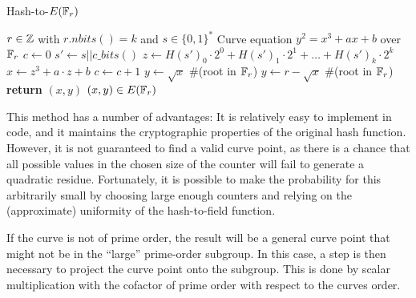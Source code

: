 \begin{algorithm}\caption{Hash-to-$E(\mathbb{F}_r)$}
\begin{algorithmic}[0]
\Require $r \in \mathbb{Z}$ with $r.nbits()=k$ and $s\in\{0,1\}^*$
\Require Curve equation $y^2 = x^3 + ax +b$ over $\mathbb{F}_r$
\State $c \gets 0$
\Repeat
\State $s' \gets s||c\_bits()$
\State $z \gets H(s')_0\cdot 2^0 + H(s')_1\cdot 2^1 + \ldots + H(s')_{k}\cdot 2^{k}$
\State $x\gets z^3 + a\cdot z + b$
\State $c\gets c+1$
\State $y \gets \sqrt{x}$ \#(root in $\mathbb{F}_r$)
\Else 
\State $y \gets r-\sqrt{x}$ \#(root in $\mathbb{F}_r$)
\EndIf
\State \textbf{return} $(x,y)$
\EndProcedure
\Ensure $(x,y)\in E(\mathbb{F}_r)$
\end{algorithmic}
\end{algorithm}

This method has a number of advantages: It is relatively easy to implement in code, and it maintains the cryptographic properties of the original hash function. However, it is not guaranteed to find a valid curve point, as there is a chance that all possible values in the chosen size of the counter will fail to generate a quadratic residue. Fortunately, it is possible to make the probability for this arbitrarily small by choosing large enough counters and relying on the (approximate) uniformity of the hash-to-field function. 



If the curve is not of prime order, the result will be a general curve point that might not be in the ``large'' prime-order subgroup. In this case, a  step is then necessary to project the curve point onto the subgroup. This is done by scalar multiplication with the cofactor of prime order with respect to the curves order.

